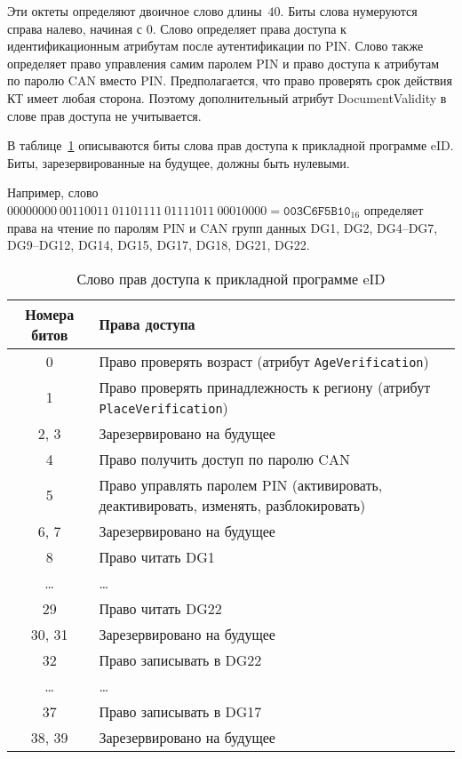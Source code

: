 Эти октеты определяют двоичное слово длины~$40$.
Биты слова нумеруются справа налево, начиная с 0. 
Слово определяет права доступа к идентификационным атрибутам после 
аутентификации по PIN.  
%
Слово также определяет право управления самим паролем 
PIN и право доступа к атрибутам по паролю CAN вместо PIN. 
%
Предполагается, что право проверять срок действия КТ 
имеет любая сторона. Поэтому дополнительный атрибут DocumentValidity 
в слове прав доступа не учитывается. 

В таблице~\ref{Table.DATA.Access} описываются биты слова прав 
доступа к прикладной программе eID. Биты, зарезервированные на будущее, 
должны быть нулевыми.

Например, слово 
$00000000\ 00110011\ 01101111\ 01111011\ 00010000 = \texttt{003С6F5B10}_{16}$ 
определяет права на чтение по паролям PIN и CAN групп данных DG1, DG2, 
DG4--DG7, DG9--DG12, DG14, DG15, DG17, DG18, DG21, DG22.

\begin{table}[h!]
\caption{Слово прав доступа к прикладной программе eID}
\label{Table.DATA.Access}
\begin{tabular}{|c|p{13.5cm}|}
\hline
Номера битов & Права доступа\\
\hline
\hline
0 & 
Право проверять возраст (атрибут \verb|AgeVerification|)\\
\hline 
1  & 
Право проверять принадлежность к региону (атрибут \verb|PlaceVerification|)\\
\hline 
2, 3 & 
Зарезервировано на будущее\\
\hline 
4 & 
Право получить доступ по паролю CAN\\
\hline
5 & 
Право управлять паролем PIN
(активировать, деактивировать, изменять, разблокировать)\\
\hline 
6, 7 & 
Зарезервировано на будущее\\
\hline 
8  & 
Право читать DG1\\
\hline 
\dots &	\dots\\
\hline 
29 & 
Право читать DG22\\
\hline
30, 31 & 
Зарезервировано на будущее\\
\hline 
32 & 
Право записывать в DG22\\
\hline
\dots &	\dots  \\
\hline
37 & 
Право записывать в DG17\\
\hline 
38, 39 & 
Зарезервировано на будущее\\
\hline                                                                
\end{tabular}
\end{table}
                                                                            
